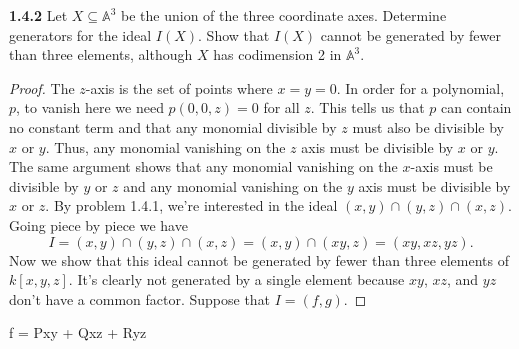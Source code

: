 \documentclass[11pt,letterpaper]{report}
\newcommand{\affine}{\mathbb{A}}
\begin{document}
\noindent\textbf{1.4.2}
Let $X\subseteq \affine^3$ be the union of the three coordinate axes. Determine generators for the ideal $I(X)$. Show that $I(X)$ cannot be generated by fewer than three elements, although $X$ has codimension 2 in $\affine^3$.
\begin{proof}
	The $z$-axis is the set of points where $x=y=0$. In order for a polynomial, $p$, to vanish here we need $p(0, 0, z) = 0$ for all $z$. This tells us that $p$ can contain no constant term and that any monomial divisible by $z$ must also be divisible by $x$ or $y$. Thus, any monomial vanishing on the $z$ axis must be divisible by $x$ or $y$. The same argument shows that any monomial vanishing on the $x$-axis must be divisible by $y$ or $z$ and any monomial vanishing on the $y$ axis must be divisible by $x$ or $z$. By problem 1.4.1, we're interested in the ideal $(x,y)\cap (y, z)\cap (x, z)$.\\
	Going piece by piece we have
	\[
	I = (x,y)\cap (y,z)\cap (x,z) = (x,y)\cap (xy, z) = (xy, xz, yz).
	\]
	Now we show that this ideal cannot be generated by fewer than three elements of $k[x,y,z]$. It's clearly not generated by a single element because $xy$, $xz$, and $yz$ don't have a common factor. Suppose that $I = (f,g)$. 
\end{proof}

f = Pxy + Qxz + Ryz
\end{document}

